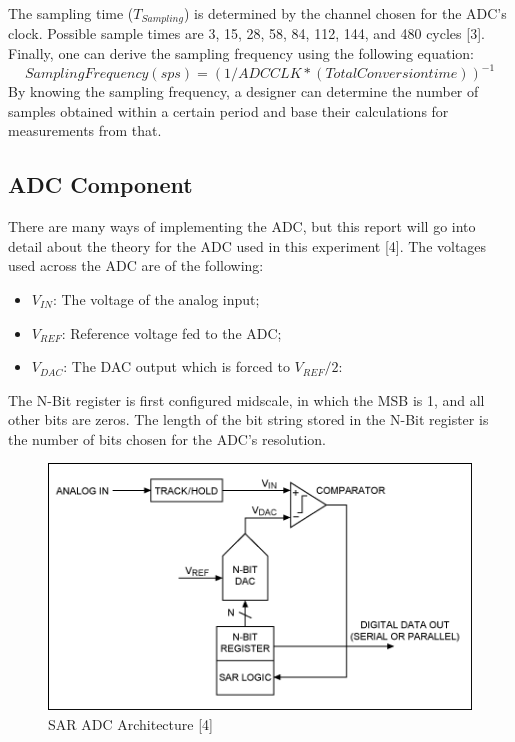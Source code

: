 \documentclass[12pt]{report}
\begin{document}
The sampling time (\(T_{Sampling}\)) is determined by the channel chosen for the ADC’s clock. Possible sample times are 3, 15, 28, 58, 84, 112, 144, and 480 cycles [3].\\
Finally, one can derive the sampling frequency using the following equation:
\[ Sampling Frequency (sps) = (1/ADCCLK * (Total Conversion time))^{-1} \]
By knowing the sampling frequency, a designer can determine the number of samples obtained within a certain period and base their calculations for measurements from that.\\
\subsection{ADC Component}
There are many ways of implementing the ADC, but this report will go into detail about the theory for the ADC used in this experiment [4]. The voltages used across the ADC are of the following:\\
\begin{itemize}
	\item \(V_{IN}\): The voltage of the analog input;
	\item \(V_{REF}\): Reference voltage fed to the ADC; 
	\item \(V_{DAC}\): The DAC output which is forced to \(V_{REF}/2\):
\end{itemize}
The N-Bit register is first configured midscale, in which the MSB is 1, and all other bits are zeros. The length of the bit string stored in the N-Bit register is the number of bits chosen for the ADC’s resolution.\\
\begin{figure}\label{adc}
	\begin{center}
		\includegraphics{adc.png}
		\caption{SAR ADC Architecture [4]}
	\end{center}
\end{figure}
\end{document}
